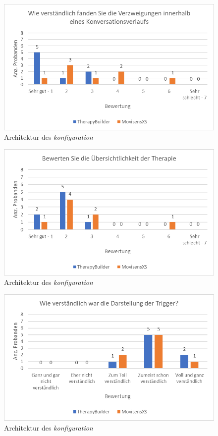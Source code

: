 \begin{figure}[h]
\centering
\includegraphics[width=1\textwidth]{pictures/diagramme/konvverzweig}
\caption{Architektur des \emph{konfiguration}}
\label{konvverzweig}
\end{figure}

\begin{figure}[h]
\centering
\includegraphics[width=1\textwidth]{pictures/diagramme/therapieuebersicht}
\caption{Architektur des \emph{konfiguration}}
\label{therapieuebersicht}
\end{figure}

\begin{figure}[h]
\centering
\includegraphics[width=1\textwidth]{pictures/diagramme/triggerdarstellung}
\caption{Architektur des \emph{konfiguration}}
\label{triggerdarstellung}
\end{figure}

